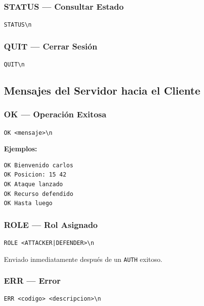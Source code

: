 \documentclass[12pt, letterpaper]{article}
\begin{document}
\subsubsection{STATUS --- Consultar Estado}

\begin{lstlisting}
STATUS\n
\end{lstlisting}

\subsubsection{QUIT --- Cerrar Sesión}

\begin{lstlisting}
QUIT\n
\end{lstlisting}

\subsection{Mensajes del Servidor hacia el Cliente}

\subsubsection{OK --- Operación Exitosa}

\begin{lstlisting}
OK <mensaje>\n
\end{lstlisting}

\textbf{Ejemplos:}
\begin{lstlisting}
OK Bienvenido carlos
OK Posicion: 15 42
OK Ataque lanzado
OK Recurso defendido
OK Hasta luego
\end{lstlisting}

\subsubsection{ROLE --- Rol Asignado}

\begin{lstlisting}
ROLE <ATTACKER|DEFENDER>\n
\end{lstlisting}

Enviado inmediatamente después de un \texttt{AUTH} exitoso.

\subsubsection{ERR --- Error}

\begin{lstlisting}
ERR <codigo> <descripcion>\n
\end{lstlisting}
\end{document}
